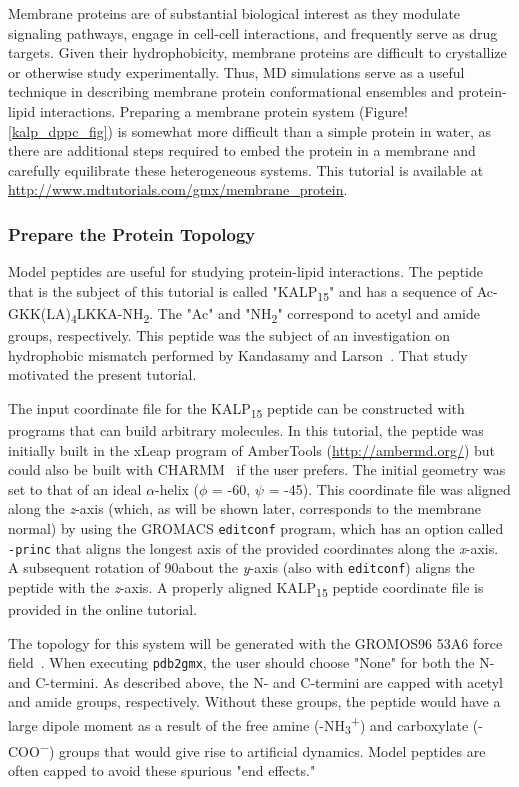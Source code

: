 \documentclass[9pt,tutorial,pubversion]{livecoms}
\newcommand{\urlstring}{http://www.mdtutorials.com/gmx}
\newcommand{\tutorialkalp}{\url{\urlstring/membrane_protein}}
\begin{document}
Membrane proteins are of substantial biological interest as they modulate signaling pathways, engage in cell-cell interactions, and frequently serve as drug targets. Given their hydrophobicity, membrane proteins are difficult to crystallize or otherwise study experimentally. Thus, MD simulations serve as a useful technique in describing membrane protein conformational ensembles and protein-lipid interactions. Preparing a membrane protein system (Figure!\ref{kalp_dppc_fig}) is somewhat more difficult than a simple protein in water, as there are additional steps required to embed the protein in a membrane and carefully equilibrate these heterogeneous systems. This tutorial is available at \tutorialkalp.

\subsubsection{Prepare the Protein Topology} \label{kalp_protein_topology}

Model peptides are useful for studying protein-lipid interactions. The peptide that is the subject of this tutorial is called "KALP\textsubscript{15}" and has a sequence of Ac-GKK(LA)\textsubscript{4}LKKA-NH\textsubscript{2}. The "Ac" and "NH\textsubscript{2}" correspond to acetyl and amide groups, respectively. This peptide was the subject of an investigation on hydrophobic mismatch performed by Kandasamy and Larson~\cite{Kandasamy2006}. That study motivated the present tutorial.

The input coordinate file for the KALP\textsubscript{15} peptide can be constructed with programs that can build arbitrary molecules. In this tutorial, the peptide was initially built in the xLeap program of AmberTools (\url{http://ambermd.org/}) but could also be built with CHARMM~\cite{Brooks2009} if the user prefers. The initial geometry was set to that of an ideal $\alpha$-helix ($\phi$ = -60\textdegree, $\psi$ = -45\textdegree). This coordinate file was aligned along the {\em z}-axis (which, as will be shown later, corresponds to the membrane normal) by using the GROMACS \texttt{editconf} program, which has an option called \texttt{-princ} that aligns the longest axis of the provided coordinates along the {\em x}-axis. A subsequent rotation of 90\textdegree about the {\em y}-axis (also with \texttt{editconf}) aligns the peptide with the {\em z}-axis. A properly aligned KALP\textsubscript{15} peptide coordinate file is provided in the online tutorial.

The topology for this system will be generated with the GROMOS96 53A6 force field~\cite{Oostenbrink2004}. When executing \texttt{pdb2gmx}, the user should choose "None" for both the N- and C-termini. As described above, the N- and C-termini are capped with acetyl and amide groups, respectively. Without these groups, the peptide would have a large dipole moment as a result of the free amine (-NH\textsubscript{3}\textsuperscript{+}) and carboxylate (-COO\textsuperscript{$-$}) groups that would give rise to artificial dynamics. Model peptides are often capped to avoid these spurious "end effects."
\end{document}
